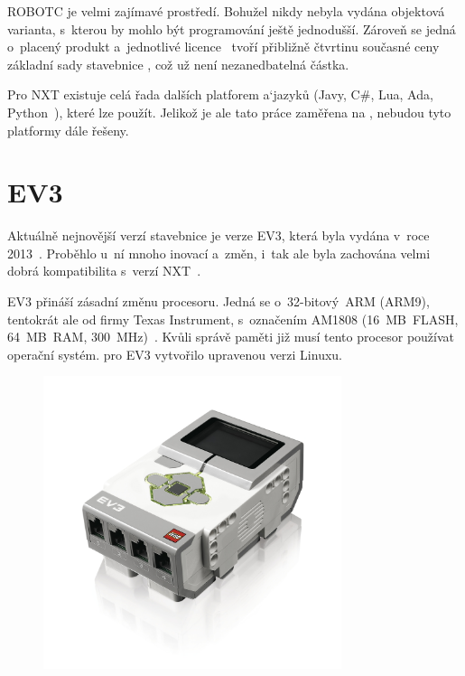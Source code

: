 ROBOTC je velmi zajímavé prostředí. Bohužel nikdy nebyla vydána objektová varianta, s~kterou by mohlo být programování ještě jednodušší. 
Zároveň se jedná o~placený produkt a~jednotlivé licence~\cite{legoProgramingPlatform_ROBOTC-price} tvoří přibližně čtvrtinu současné ceny základní sady stavebnice \legoEV{~}\cite{lego_eduxeEshop_CoreSet}, což už není nezanedbatelná částka.

Pro NXT existuje celá řada dalších platforem a`jazyků (Javy, C\#, Lua, Ada, Python~\cite{legoMindstormsNXT_Programming}), které lze použít. 
Jelikož je ale tato práce zaměřena na \legoEV{ }, nebudou tyto platformy dále řešeny. 

\section{\legoM{ }EV3}

Aktuálně nejnovější verzí stavebnice \legoM{ }je verze EV3, která byla vydána v~roce 2013~\cite{lego_mindstormsHistory}. 
Proběhlo u~ní mnoho inovací a~změn, i~tak ale byla zachována velmi dobrá kompatibilita s~verzí NXT~\cite{legoRobotSquare_EV3-and-NXT-compatibility}.

EV3 přináší zásadní změnu procesoru. 
Jedná se o~32-bitový~ARM (ARM9), tentokrát ale od firmy Texas Instrument, s~označením AM1808 (16~MB~FLASH, 64~MB~RAM, 300~MHz)~\cite{legoMindstormsEV3_fw-dev-kit}. 
Kvůli správě paměti již musí tento procesor používat operační systém. %
\lego{ }pro EV3 vytvořilo upravenou verzi Linuxu. 

\begin{figure}[h]
	\centering
	\includegraphics[width=330px]{images/lego-mindstorms-ev3_brick.jpg}
	\caption[]{\legoEV{ \brick}\protect\footnotemark}
	\label{fig:lego-mindstorms-ev3_brick}
\end{figure}

